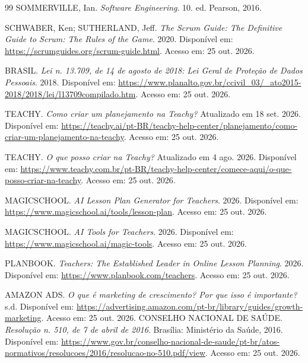 \documentclass[12pt,a4paper,oneside]{report}
\begin{document}
\begin{thebibliography}{99}
\sloppy %
SOMMERVILLE, Ian. \textit{Software Engineering}. 10. ed. Pearson, 2016.

SCHWABER, Ken; SUTHERLAND, Jeff. \textit{The Scrum Guide: The Definitive Guide to Scrum: The Rules of the Game}. 2020. Disponível em: \url{https://scrumguides.org/scrum-guide.html}. Acesso em: 25 out. 2026.

BRASIL. \textit{Lei n. 13.709, de 14 de agosto de 2018: Lei Geral de Proteção de Dados Pessoais}. 2018. Disponível em: \url{https://www.planalto.gov.br/ccivil_03/_ato2015-2018/2018/lei/l13709compilado.htm}. Acesso em: 25 out. 2026.

TEACHY. \textit{Como criar um planejamento na Teachy?} Atualizado em 18 set. 2026. Disponível em: \url{https://teachy.ai/pt-BR/teachy-help-center/planejamento/como-criar-um-planejamento-na-teachy}. Acesso em: 25 out. 2026.

TEACHY. \textit{O que posso criar na Teachy?} Atualizado em 4 ago. 2026. Disponível em: \url{https://www.teachy.com.br/pt-BR/teachy-help-center/comece-aqui/o-que-posso-criar-na-teachy}. Acesso em: 25 out. 2026.

MAGICSCHOOL. \textit{AI Lesson Plan Generator for Teachers}. 2026. Disponível em: \url{https://www.magicschool.ai/tools/lesson-plan}. Acesso em: 25 out. 2026.

MAGICSCHOOL. \textit{AI Tools for Teachers}. 2026. Disponível em: \url{https://www.magicschool.ai/magic-tools}. Acesso em: 25 out. 2026.

PLANBOOK. \textit{Teachers: The Established Leader in Online Lesson Planning}. 2026. Disponível em: \url{https://www.planbook.com/teachers}. Acesso em: 25 out. 2026.

AMAZON ADS. \textit{O que é marketing de crescimento? Por que isso é importante?} s.d. Disponível em: \url{https://advertising.amazon.com/pt-br/library/guides/growth-marketing}. Acesso em: 25 out. 2026.
CONSELHO NACIONAL DE SAÚDE. \textit{Resolução n. 510, de 7 de abril de 2016}. Brasília: Ministério da Saúde, 2016. Disponível em: \url{https://www.gov.br/conselho-nacional-de-saude/pt-br/atos-normativos/resolucoes/2016/resolucao-no-510.pdf/view}. Acesso em: 25 out. 2026.


\end{thebibliography}
\end{document}
